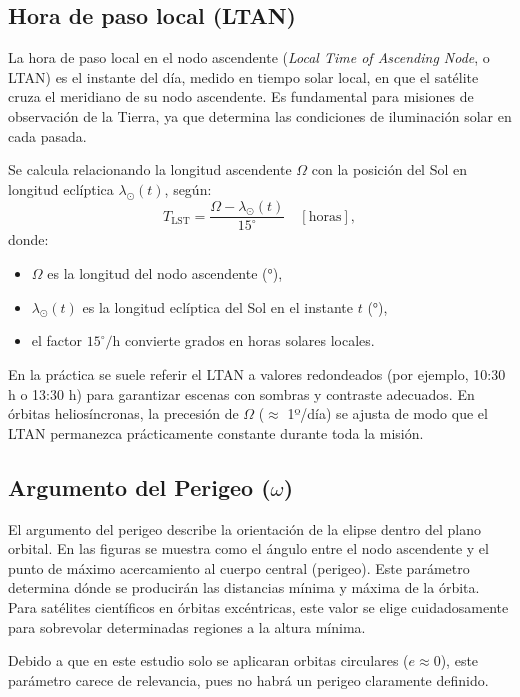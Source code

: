 \subsection{Hora de paso local (LTAN)}

La hora de paso local en el nodo ascendente (\textit{Local Time of Ascending Node}, o LTAN) es el instante del día, medido en tiempo solar local, en que el satélite cruza el meridiano de su nodo ascendente. Es fundamental para misiones de observación de la Tierra, ya que determina las condiciones de iluminación solar en cada pasada.

Se calcula relacionando la longitud ascendente $\Omega$ con la posición del Sol en longitud eclíptica $\lambda_\odot(t)$, según:
\[
T_{\mathrm{LST}} 
= \frac{\Omega - \lambda_\odot(t)}{15^\circ}\quad[\mathrm{horas}],
\]
donde:
\begin{itemize}
  \item $\Omega$ es la longitud del nodo ascendente (°),
  \item $\lambda_\odot(t)$ es la longitud eclíptica del Sol en el instante $t$ (°),
  \item el factor $15^\circ/$h convierte grados en horas solares locales.
\end{itemize}

En la práctica se suele referir el LTAN a valores redondeados (por ejemplo, 10:30 h o 13:30 h) para garantizar escenas con sombras y contraste adecuados. En órbitas heliosíncronas, la precesión de $\Omega$ ($\approx$ 1º/día) se ajusta de modo que el LTAN permanezca prácticamente constante durante toda la misión.


\subsection{Argumento del Perigeo ($\omega$)}

El argumento del perigeo describe la orientación de la elipse dentro del plano orbital. En las figuras se muestra como el ángulo entre el nodo ascendente y el punto de máximo acercamiento al cuerpo central (perigeo). Este parámetro determina dónde se producirán las distancias mínima y máxima de la órbita. Para satélites científicos en órbitas excéntricas, este valor se elige cuidadosamente para sobrevolar determinadas regiones a la altura mínima. 

Debido a que en este estudio solo se aplicaran orbitas circulares ($e\approx0$), este parámetro carece de relevancia, pues no habrá un perigeo claramente definido.

